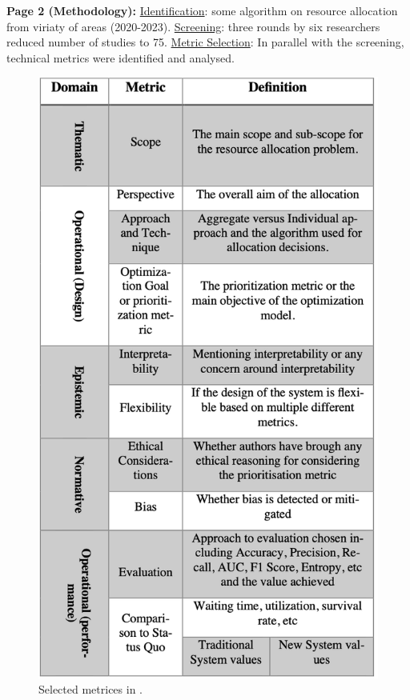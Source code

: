     \textbf{Page 2 (Methodology):}
    \underline{Identification}: some algorithm on resource allocation from viriaty of areas (2020-2023). \underline{Screening}: three rounds by six researchers reduced number of studies to 75. \underline{Metric Selection}: In parallel with the screening, technical metrics were identified and analysed.
    \begin{figure}[H]
        \centering
        \includegraphics[width=.64\textwidth]{figures/AR0017GB23/fig1.png}
        \caption{Selected metrices in \cite{x121}.}
        \label{fig1:AR0017GB23}
    \end{figure}
    
